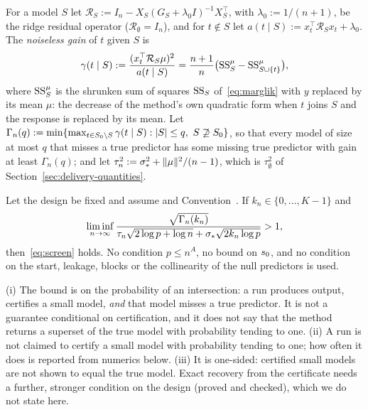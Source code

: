 
For a model $S$ let $\mathcal R_S:=I_n-X_S(G_S+\lambda_0I)^{-1}X_S^\top$, with $\lambda_0:=1/(n+1)$, be the ridge residual
operator ($\mathcal R_\emptyset=I_n$), and for $t\notin S$ let $a(t\mid S):=x_t^\top\mathcal R_Sx_t+\lambda_0$. The
\emph{noiseless gain} of $t$ given $S$ is
\[
  \gamma(t\mid S):=\frac{(x_t^\top\mathcal R_S\mu)^2}{a(t\mid S)}=\frac{n+1}{n}\big(\mathrm{SS}^{\mu}_S-\mathrm{SS}^{\mu}_{S\cup\{t\}}\big),
\]
where $\mathrm{SS}^{\mu}_S$ is the shrunken sum of squares $\mathrm{SS}_S$ of~\eqref{eq:marglik} with $y$ replaced by its mean $\mu$: the
decrease of the method's own quadratic form when $t$ joins $S$ and the response is replaced by its mean. Let
$\Gamma_n(q):=\min\{\max_{t\in S_0\setminus S}\gamma(t\mid S):\lvert S\rvert\le q,\ S\not\supseteq S_0\}$, so that every model of
size at most $q$ that misses a true predictor has some missing true predictor with gain at least $\Gamma_n(q)$; and let
$\tau_n^2:=\sigma_*^2+\lVert \mu\rVert^2/(n-1)$, which is $\tau^2_\emptyset$ of Section~\ref{sec:delivery-quantities}.

\begin{theorem}\label{thm:screen-margin}
Let the design be fixed and assume  and Convention~. If $k_n\in\{0,\dots,K-1\}$ and
\begin{equation}\label{eq:gain-margin}
  \liminf_{n\to\infty}\frac{\sqrt{\Gamma_n(k_n)}}{\tau_n\sqrt{2\log p+\log n}+\sigma_*\sqrt{2k_n\log p}}>1 ,
\end{equation}
then~\eqref{eq:screen} holds. No condition $p\le n^A$, no bound on $s_0$, and no condition on the start, leakage, blocks
or the collinearity of the null predictors is used.
\end{theorem}


\begin{remark}\label{rem:screen}
(i) The bound is on the probability of an intersection: a run produces output, certifies a small model, \emph{and} that
model misses a true predictor. It is not a guarantee conditional on certification, and it does not say that the method
returns a superset of the true model with probability tending to one.
(ii) A run is not claimed to certify a small model with probability tending to one; how often it does is reported from
numerics below.
(iii) It is one-sided: certified small models are not shown to equal the true model. Exact recovery from the certificate
needs a further, stronger condition on the design (proved and checked), which we do not state here.
\end{remark}

